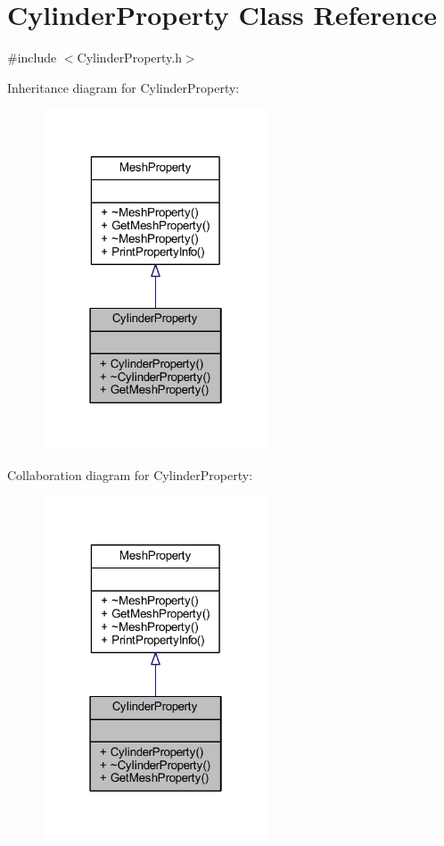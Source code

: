 \hypertarget{class_cylinder_property}{}\section{Cylinder\+Property Class Reference}
\label{class_cylinder_property}


{\ttfamily \#include $<$Cylinder\+Property.\+h$>$}



Inheritance diagram for Cylinder\+Property\+:\nopagebreak
\begin{figure}[H]
\begin{center}
\leavevmode
\includegraphics[width=190pt]{class_cylinder_property__inherit__graph}
\end{center}
\end{figure}


Collaboration diagram for Cylinder\+Property\+:\nopagebreak
\begin{figure}[H]
\begin{center}
\leavevmode
\includegraphics[width=190pt]{class_cylinder_property__coll__graph}
\end{center}
\end{figure}
